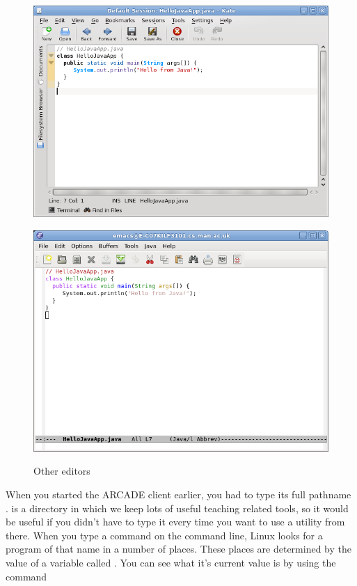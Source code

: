 \begin{figure}
  \begin{minipage}[b]{.5\linewidth}
    \centering
    \includegraphics[width=.8\textwidth]{images/kate}  
    \label{subfig:kate}
  \end{minipage}%
  \begin{minipage}[b]{.5\linewidth}
    \centering
    \includegraphics[width=.8\textwidth]{images/emacs}
    \label{subfig:emacs}
  \end{minipage}%
  \caption{Other editors}  \label{fig:texteditors}
  
\end{figure}

When you started the  ARCADE client earlier, you had to type its full pathname .  is a directory in which we keep lots of useful teaching related tools, so it would be useful if you didn't have to type it every time you want to use a utility from there. When you type a command on the command line, Linux looks for a program of that name in a number of places. These places are determined by the value of a variable called . You can see what it's current value is by using the command

